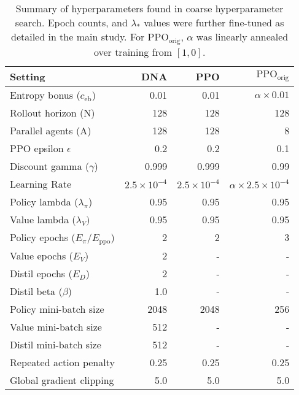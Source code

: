 \documentclass{article}
\begin{document}
\begin{table}[h]
    \centering
    
    \begin{tabular}{l r r r }
    \toprule
        Setting & DNA & PPO & $\text{PPO}_\text{orig}$ \\
    \midrule
Entropy bonus ($c_\text{eb}$)   & 0.01 & 0.01 & $\alpha \times 0.01$  \\ 
        Rollout horizon (N)             & 128 & 128 & 128 \\
        Parallel agents (A)             & 128 & 128 & 8 \\
        PPO epsilon $\epsilon$          & 0.2 & 0.2 & 0.1 \\
        Discount gamma ($\gamma$)       & 0.999 & 0.999 & 0.99 \\


        Learning Rate                   & $2.5 \times 10^{-4}$ & $2.5 \times 10^{-4}$ & $\alpha \times 2.5 \times 10^{-4}$ \\
        
        Policy lambda ($\lambda_\pi$)   & 0.95 & 0.95 & 0.95 \\ 
        Value lambda ($\lambda_V)$     & 0.95 & 0.95 & 0.95 \\ 
        
        Policy epochs ($E_\pi/E_\text{ppo}$)         & 2 & 2 & 3 \\
        Value epochs ($E_V$)            & 2 & - & - \\
        Distil epochs ($E_D$)           & 2 & - & - \\
        Distil beta ($\beta$)           & 1.0 & - & - \\
        
        Policy mini-batch size          & 2048 & 2048 & 256 \\ 
        Value mini-batch size           & 512 & - & - \\
        Distil mini-batch size          & 512 & - & - \\
        Repeated action penalty         & 0.25 & 0.25 & 0.25 \\ 
        Global gradient clipping        & 5.0 & 5.0 & 5.0 \\ 
        
    \bottomrule
    \end{tabular}
        
    \caption{Summary of hyperparameters found in coarse hyperparameter search. Epoch counts, and $\lambda_*$ values were further fine-tuned as detailed in the main study. For $\text{PPO}_\text{orig}$, $\alpha$ was linearly annealed over training from $[1, 0]$.}
    \label{tab:main_hps}
\end{table}
\end{document}
